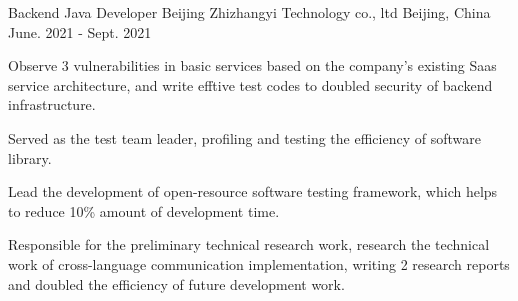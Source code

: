 \begin{cventries}
  \cventry
    {Backend Java Developer} %
    {Beijing Zhizhangyi Technology co., ltd} %
    {Beijing, China} %
    {June. 2021 - Sept. 2021} %
    {
      \begin{cvitems} %
        \item {Observe 3 vulnerabilities in basic services based on the company's existing Saas service architecture, and write efftive test codes to doubled security of backend infrastructure.}
        \item {Served as the test team leader, profiling and testing the efficiency of software library.}
        \item {Lead the development of open-resource software testing framework, which helps to reduce 10\% amount of development time.}
        \item {Responsible for the preliminary technical research work, research the technical work of cross-language communication implementation, writing 2 research reports and doubled the efficiency of future development work.}
      \end{cvitems}
    }




\end{cventries}
